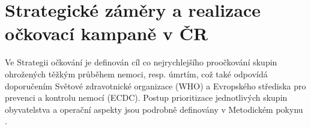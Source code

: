 




\section*{Strategické záměry a realizace očkovací kampaně v ČR}
\label{sec:strategie}

Ve Strategii očkování \cite{strategie_covid} je definován cíl co nejrychlejšího proočkování skupin ohrožených těžkým průběhem nemoci, resp. úmrtím, což také odpovídá doporučením Světové zdravotnické organizace (WHO) a Evropského střediska pro prevenci a kontrolu nemocí (ECDC). Postup prioritizace jednotlivých skupin obyvatelstva a operační aspekty jsou podrobně definovány v Metodickém pokynu \cite{ockovani_mp}. %
%

